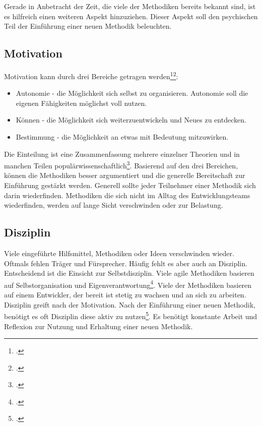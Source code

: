 Gerade in Anbetracht der Zeit, die viele der Methodiken bereits bekannt sind, ist es hilfreich einen weiteren Aspekt hinzuziehen. Dieser Aspekt soll den psychischen Teil der Einführung einer neuen Methodik beleuchten.

\subsection{Motivation}

Motivation kann durch drei Bereiche getragen werden\footcite[vgl.][]{codingame-drive}\footcite[vgl.][Kap. Autonomie ff.]{pink-drive}:
\begin{itemize}
\item Autonomie - die Möglichkeit sich selbst zu organisieren. Autonomie soll die eigenen Fähigkeiten möglichst voll nutzen.
\item Können - die Möglichkeit sich weiterzuentwickeln und Neues zu entdecken.
\item Bestimmung - die Möglichkeit an etwas mit Bedeutung mitzuwirken.
\end{itemize}

Die Einteilung ist eine Zusammenfassung mehrere einzelner Theorien und in manchen Teilen populärwissenschaftlich\footcite[vgl.][]{drive-scholarly-review}. Basierend auf den drei Bereichen, können die Methodiken besser argumentiert und die generelle Bereitschaft zur Einführung gestärkt werden. Generell sollte jeder Teilnehmer einer Methodik sich darin wiederfinden. Methodiken die sich nicht im Alltag des Entwicklungsteams wiederfinden, werden auf lange Sicht verschwinden oder zur Belastung.

\subsection{Disziplin}

Viele eingeführte Hilfsmittel, Methodiken oder Ideen verschwinden wieder. Oftmals fehlen Träger und Fürsprecher. Häufig fehlt es aber auch an Disziplin. Entscheidend ist die Einsicht zur Selbstdisziplin. Viele agile Methodiken basieren auf Selbstorganisation und Eigenverantwortung\footcite[vgl.][]{codingame-agile-failed}. Viele der Methodiken basieren auf einem Entwickler, der bereit ist stetig zu wachsen und an sich zu arbeiten.
Disziplin greift nach der Motivation. Nach der Einführung einer neuen Methodik, benötigt es oft Disziplin diese aktiv zu nutzen\footcite[vgl.][]{screw-motivation}. Es benötigt konstante Arbeit und Reflexion zur Nutzung und Erhaltung einer neuen Methodik.

